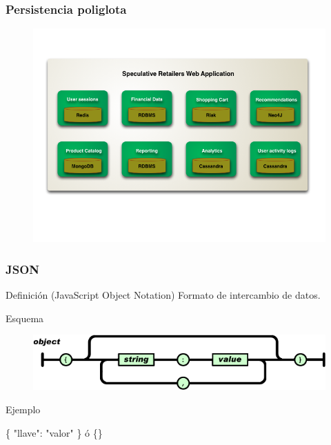\documentclass{beamer}
\begin{document}
\begin{frame}
\frametitle{Persistencia poliglota}
\begin{figure}
\includegraphics[width=1.0\linewidth]{polyglot.png}
\end{figure}
\end{frame}


\begin{frame}
\frametitle{JSON}
\begin{block}{Definici\'on}
 (JavaScript Object Notation) Formato de intercambio de datos.
\end{block}

\begin{block}{Esquema}
\begin{figure}
\includegraphics[width=0.7\linewidth]{object.png}
\end{figure}
\end{block}

\begin{block}{Ejemplo}
\begin{center}
\{ "llave": "valor" \} \'o \{\}
\end{center}
\end{block}
\end{frame}

\end{document}
